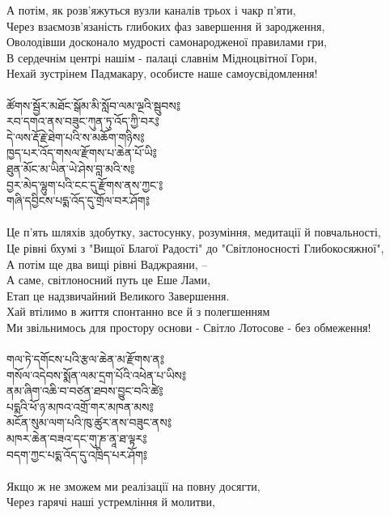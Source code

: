 {\ru
А потім, як розв'яжуться вузли каналів трьох і чакр п'яти,\\
Через взаємозв'язаність глибоких фаз завершення й зародження,\\
Оволодівши досконало мудрості самонародженої правилами гри,\\
В сердечнім центрі нашім - палаці славнім Мідноцвітної Гори, \\
Нехай зустрінем Падмакару, особисте наше самоусвідомлення!\\
\\
\newpage
{\ti ཚོགས་སྦྱོར་མཐོང་སྒོམ་མི་སློབ་ལམ་ལྔའི་སྦུབས༔\\
རབ་དགའ་ནས་བཟུང་ཀུན་ཏུ་འོད་ཀྱི་བར༔\\
དེ་ལས་རྡོ་རྗེ་ཐེག་པའི་ས་མཆོག་གཉིས༔\\
ཁྱད་པར་འོད་གསལ་རྫོགས་པ་ཆེན་པོ་ཡི༔\\
ཐུན་མོང་མ་ཡིན་ཡེ་ཤེས་བླ་མའི་ས༔\\
བྱར་མེད་ལྷུག་པའི་ངང་དུ་རྫོགས་ནས་ཀྱང་༔\\
གཞི་དབྱིངས་པདྨ་འོད་དུ་གྲོལ་བར་ཤོག༔}\\
\\
\ru
Це п'ять шляхів здобутку, застосунку, розуміння, медитації й повчальності,\\
Це рівні бхумі з "Вищої Благої Радості" до "Світлоносності Глибокосяжної",\\
А потім ще два вищі рівні Ваджраяни, --\\
А саме, світлоносний путь це Еше Лами,\\
Етап це надзвичайний Великого Завершення. \\
Хай втілимо в життя спонтанно все й з полегшенням \\
Ми звільнимось для простору основи - Світло Лотосове - без обмеження!\\
\\
{\ti གལ་ཏེ་དགོངས་པའི་རྩལ་ཆེན་མ་རྫོགས་ན༔\\
གསོལ་འདེབས་སྨོན་ལམ་དྲག་པོའི་འཕེན་པ་ཡིས༔\\
ནམ་ཞིག་འཆི་བ་བཙན་ཐབས་བྱུང་བའི་ཚེ༔\\
པདྨའི་ཕོ་ཉ་མཁའ་འགྲོ་གར་མཁན་མས༔\\
མངོན་སུམ་ལག་པའི་ཁུ་ཚུར་ནས་བཟུང་ནས༔\\
མཁར་ཆེན་བཟའ་དང་གུ་ཎ་ནཱ་ཐ་ལྟར༔\\
བདག་ཀྱང་པདྨ་འོད་དུ་འཁྲིད་པར་ཤོག༔}\\
\\
Якщо ж не зможем ми реалізації на повну досягти,\\
Через гарячі наші устремління й молитви,\\
}
